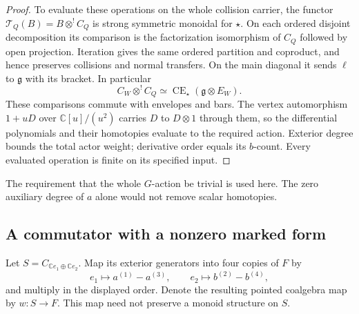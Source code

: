 \begin{proof}
To evaluate these operations on the whole collision
carrier, the functor
$\mathcal T_Q(B)=B\otimes^!C_Q$ is strong symmetric
monoidal for $\star$. On each ordered disjoint
decomposition its comparison is the factorization
isomorphism of $C_Q$ followed by open projection.
Iteration gives the same ordered partition and
coproduct, and hence preserves collisions and normal
transfers. On the main diagonal it sends $\ell$ to
$\mathfrak g$ with its bracket. In particular
\[
 C_W\otimes^!C_Q
 \simeq\operatorname{CE}_\star(\mathfrak g\otimes E_W).
\]
These comparisons commute with envelopes and bars.
The vertex automorphism $1+uD$ over
$\mathbb C[u]/(u^2)$ carries $D$ to $D\otimes1$
through them, so the differential polynomials and
their homotopies evaluate to the required action.
Exterior degree bounds the total actor weight;
derivative order equals its $b$-count. Every
evaluated operation is finite on its specified input.
\end{proof}

The requirement that the whole $G$-action be trivial
is used here. The zero auxiliary degree of $a$ alone
would not remove scalar homotopies.

\subsection{A commutator with a nonzero marked form}

Let $S=C_{\mathbb C e_1\oplus\mathbb C e_2}$. Map its
exterior generators into four copies of $F$ by
\[
 e_1\longmapsto a^{(1)}-a^{(3)},\qquad
 e_2\longmapsto b^{(2)}-b^{(4)},
\]
and multiply in the displayed order. Denote the
resulting pointed coalgebra map by $w:S\to F$.
This map need not preserve a monoid structure on $S$.

